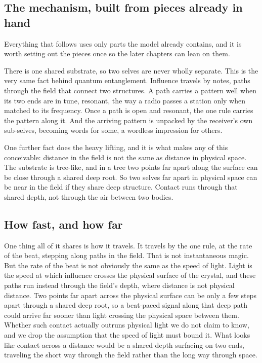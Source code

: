 \subsection{The mechanism, built from pieces already in hand}

Everything that follows uses only parts the model already contains, and it is worth setting out the pieces once so the later chapters can lean on them.

There is one shared substrate, so two selves are never wholly separate. This is the very same fact behind quantum entanglement. Influence travels by notes, paths through the field that connect two structures. A path carries a pattern well when its two ends are in tune, resonant, the way a radio passes a station only when matched to its frequency. Once a path is open and resonant, the one rule carries the pattern along it. And the arriving pattern is unpacked by the receiver's own sub-selves, becoming words for some, a wordless impression for others.

One further fact does the heavy lifting, and it is what makes any of this conceivable: distance in the field is not the same as distance in physical space. The substrate is tree-like, and in a tree two points far apart along the surface can be close through a shared deep root. So two selves far apart in physical space can be near in the field if they share deep structure. Contact runs through that shared depth, not through the air between two bodies.

\subsection{How fast, and how far}

One thing all of it shares is how it travels. It travels by the one rule, at the rate of the beat, stepping along paths in the field. That is not instantaneous magic. But the rate of the beat is not obviously the same as the speed of light. Light is the speed at which influence crosses the physical surface of the crystal, and these paths run instead through the field's depth, where distance is not physical distance. Two points far apart across the physical surface can be only a few steps apart through a shared deep root, so a beat-paced signal along that deep path could arrive far sooner than light crossing the physical space between them. Whether such contact actually outruns physical light we do not claim to know, and we drop the assumption that the speed of light must bound it. What looks like contact across a distance would be a shared depth surfacing on two ends, traveling the short way through the field rather than the long way through space.

